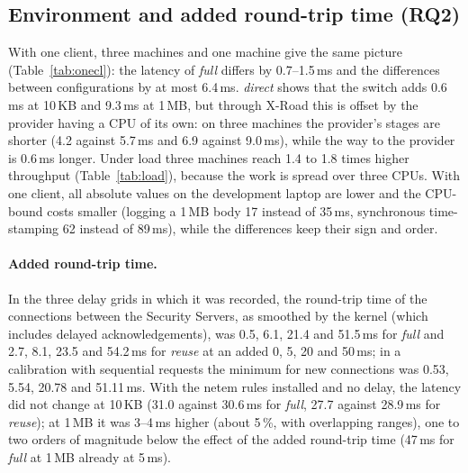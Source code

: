 \documentclass[conference,a4paper]{IEEEtran}
\newcommand{\newtext}[1]{{\color{blue}#1}}
\begin{document}
\subsection{Environment and added round-trip time \newtext{(RQ2)}}\label{sec:rtt}

With one client, three machines and one machine give the same picture (Table~\ref{tab:onecl}): the
latency of \emph{full} differs by 0.7--1.5\,ms and the differences between configurations by at most
6.4\,ms.
\emph{direct} shows that the switch adds 0.6\,ms at 10\,KB and 9.3\,ms at 1\,MB, but through X-Road
this is offset by the provider having a CPU of its own: on three machines the provider's stages are
shorter (4.2 against 5.7\,ms and 6.9 against 9.0\,ms), while the way to the provider is 0.6\,ms longer.
Under load three machines reach 1.4 to 1.8 times higher throughput (Table~\ref{tab:load}), because the
work is spread over three CPUs. With one client, all absolute values on the development laptop are lower and the
CPU-bound costs smaller (logging a 1\,MB body 17 instead of 35\,ms, synchronous time-stamping 62
instead of 89\,ms), while the differences keep their sign and order.

\paragraph{Added round-trip time.} In the three delay grids in which it was recorded,
the round-trip time of the connections between the Security Servers, as smoothed by the kernel (which
includes delayed acknowledgements), was 0.5, 6.1, 21.4 and 51.5\,ms for \emph{full} and 2.7, 8.1,
23.5 and 54.2\,ms for \emph{reuse} at an added 0, 5, 20 and 50\,ms; in a calibration with sequential
requests the minimum for new connections was 0.53, 5.54, 20.78 and 51.11\,ms. With the netem rules installed and no delay, the latency did not change at
10\,KB (31.0 against 30.6\,ms for \emph{full}, 27.7 against 28.9\,ms for \emph{reuse}); at 1\,MB it
was 3--4\,ms higher (about 5\,\%, with overlapping ranges), one to two orders of magnitude below the
effect of the added round-trip time (47\,ms for \emph{full} at 1\,MB already at 5\,ms).
\end{document}
